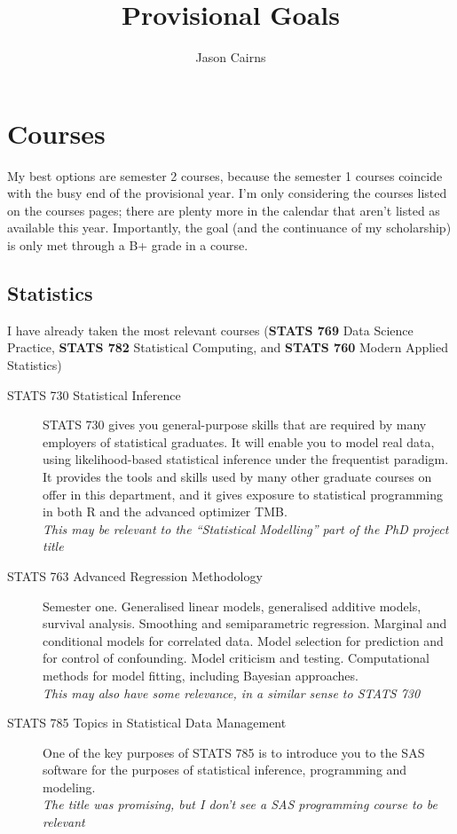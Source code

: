 \documentclass[10pt,a4paper]{article}
\begin{document}
\title{Provisional Goals}
\author{Jason Cairns}
  
\maketitle{}

\section{Courses}
\label{sec:courses} My best options are semester 2 courses, because
the semester 1 courses coincide with the busy end of the provisional
year. I'm only considering the courses listed on the courses pages;
there are plenty more in the calendar that aren't listed as available
this year. Importantly, the goal (and the continuance of my
scholarship) is only met through a B+ grade in a course.

\subsection{Statistics}
\label{sec:statistics}

I have already taken the most relevant courses (\textbf{STATS 769}
Data Science Practice, \textbf{STATS 782} Statistical Computing, and
\textbf{STATS 760} Modern Applied Statistics)

\begin{description}
\item[STATS 730 Statistical Inference] STATS 730 gives you
  general-purpose skills that are required by many employers of
  statistical graduates. It will enable you to model real data, using
  likelihood-based statistical inference under the frequentist paradigm.
  It provides the tools and skills used by many other graduate courses
  on offer in this department, and it gives exposure to statistical
  programming in both R and the advanced optimizer TMB.\\
  \textit{This may be relevant to the ``Statistical Modelling'' part
    of the PhD project title}
\item[STATS 763 Advanced Regression Methodology] Semester one.
  Generalised linear models, generalised additive models, survival
  analysis. Smoothing and semiparametric regression. Marginal and
  conditional models for correlated data. Model selection for prediction
  and for control of confounding. Model criticism and testing.
  Computational methods for model fitting, including Bayesian
  approaches.\\
  \textit{This may also have some relevance, in a similar sense to
    STATS 730}
\item[STATS 785 Topics in Statistical Data Management] One of the key
  purposes of STATS 785 is to introduce you to the SAS software for the
  purposes of statistical inference, programming and modeling.\\
  \textit{The title was promising, but I don't see a SAS programming
    course to be relevant}
\end{description}
\end{document}
